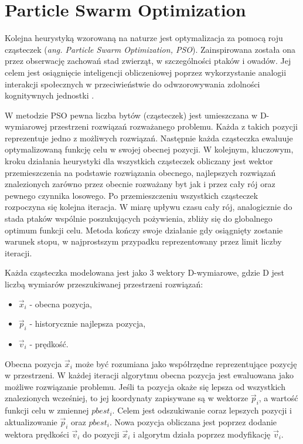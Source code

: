 \documentclass[11pt,a4paper,oneside]{report}
\begin{document}
\section{Particle Swarm Optimization}

Kolejna heurystyką wzorowaną na naturze jest optymalizacja za pomocą roju cząsteczek (\textit{ang. Particle Swarm Optimization, PSO}). Zainspirowana została ona przez obserwację zachowań stad zwierząt, w szczególności ptaków i owadów. Jej celem jest osiągnięcie inteligencji obliczeniowej poprzez wykorzystanie analogii interakcji społecznych w przeciwieństwie do odwzorowywania zdolności kognitywnych jednostki \cite{poli2007particle}. 

W metodzie PSO pewna liczba bytów (cząsteczek) jest umieszczana w D-wymiarowej przestrzeni rozwiązań rozważanego problemu. Każda z takich pozycji reprezentuje jedno z możliwych rozwiązań. Następnie każda cząsteczka ewaluuje optymalizowaną funkcję celu w swojej obecnej pozycji. W kolejnym, kluczowym, kroku działania heurystyki dla wszystkich cząsteczek obliczany jest wektor przemieszczenia na podstawie rozwiązania obecnego, najlepszych rozwiązań znalezionych zarówno przez obecnie rozważany byt jak i przez cały rój oraz pewnego czynnika losowego. Po przemieszczeniu wszystkich cząsteczek rozpoczyna się kolejna iteracja. W miarę upływu czasu cały rój, analogicznie do stada ptaków wspólnie poszukujących pożywienia, zbliży się do globalnego optimum funkcji celu. Metoda kończy swoje działanie gdy osiągnięty zostanie warunek stopu, w najprostszym przypadku reprezentowany przez limit liczby iteracji. 

Każda cząsteczka modelowana jest jako 3 wektory D-wymiarowe, gdzie D jest liczbą wymiarów przeszukiwanej przestrzeni rozwiązań:

\begin{itemize}
\item $\vec{x}_{i}$ - obecna pozycja,
\item $\vec{p}_{i}$ - historycznie najlepsza pozycja,
\item $\vec{v}_{i}$ - prędkość.
\end{itemize}

Obecna pozycja $\vec{x}_{i}$ może być rozumiana jako współrzędne reprezentujące pozycję w przestrzeni. W każdej iteracji algorytmu obecna pozycja jest ewaluowana jako możliwe rozwiązanie problemu. Jeśli ta pozycja okaże się lepsza od wszystkich znalezionych wcześniej, to jej koordynaty zapisywane są w wektorze $\vec{p}_{i}$, a wartość funkcji celu w zmiennej $pbest_{i}$. Celem jest odszukiwanie coraz lepszych pozycji i aktualizowanie $\vec{p}_{i}$ oraz $pbest_{i}$. Nowa pozycja obliczana jest poprzez dodanie wektora prędkości $\vec{v}_{i}$ do pozycji $\vec{x}_{i}$ i algorytm działa poprzez modyfikację $\vec{v}_{i}$.
\end{document}
